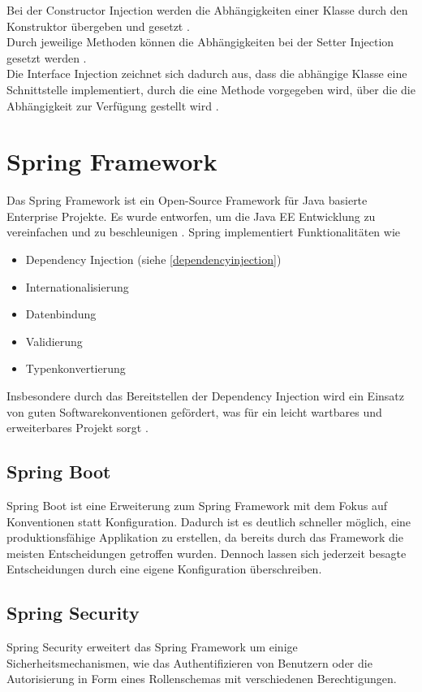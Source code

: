 Bei der Constructor Injection werden die Abhängigkeiten einer Klasse durch den Konstruktor übergeben und gesetzt \cite[S.~119]{dependency-book}.\\
Durch jeweilige Methoden können die Abhängigkeiten bei der Setter Injection gesetzt werden \cite[S.~120]{dependency-book}.\\
Die Interface Injection zeichnet sich dadurch aus, dass die abhängige Klasse eine Schnittstelle implementiert, durch die eine Methode vorgegeben wird, über die die Abhängigkeit zur Verfügung gestellt wird \cite[S.~120]{dependency-book}.

\clearpage

\section{Spring Framework}
Das Spring Framework \cite{spring} ist ein Open-Source Framework für Java basierte Enterprise Projekte. Es wurde entworfen, um die Java EE Entwicklung zu vereinfachen und zu beschleunigen \cite{spring-book-1}. Spring implementiert Funktionalitäten wie 
\begin{itemize}
	\item Dependency Injection (siehe \ref{dependencyinjection})
	\item Internationalisierung 
	\item Datenbindung
	\item Validierung
	\item Typenkonvertierung
\end{itemize}
Insbesondere durch das Bereitstellen der Dependency Injection wird ein Einsatz von guten Softwarekonventionen gefördert, was für ein leicht wartbares und erweiterbares Projekt sorgt \cite[S.~20]{spring-book-2}.

\subsection{Spring Boot}
Spring Boot ist eine Erweiterung zum Spring Framework mit dem Fokus auf Konventionen statt Konfiguration. Dadurch ist es deutlich schneller möglich, eine produktionsfähige Applikation zu erstellen, da bereits durch das Framework die meisten Entscheidungen getroffen wurden. Dennoch lassen sich jederzeit besagte Entscheidungen durch eine eigene Konfiguration überschreiben.

\subsection{Spring Security}
Spring Security erweitert das Spring Framework um einige Sicherheitsmechanismen, wie das Authentifizieren von Benutzern oder die Autorisierung in Form eines Rollenschemas mit verschiedenen Berechtigungen.

